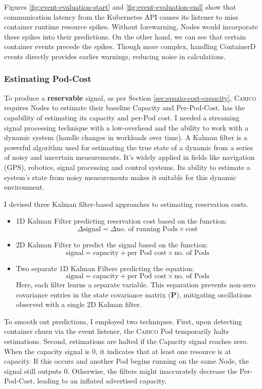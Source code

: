 Figures \ref{fig:event-evaluation-start} and
\ref{fig:event-evaluation-end} show that communication latency from the
Kubernetes API causes its listener to miss container runtime resource spikes.
Without forewarning, Nodes would incorporate these spikes into
their predictions. On the other hand, we can see that certain container
events precede the spikes. Though more complex, handling ContainerD events
directly provides earlier warnings, reducing noise in calculations.

\subsubsection{Estimating Pod-Cost}
\label{sec:estimating-cost}
To produce a \textbf{reservable} signal, as per Section
\ref{sec:spazio-cost-capacity}, \textsc{Carico} requires Nodes to estimate their
baseline Capacity and Per-Pod-Cost. has the capability of estimating its
capacity and per-Pod cost. I needed a streaming signal processing technique with
a low-overhead and the ability to work with a dynamic system (handle changes in
workloads over time). A Kalman filter \cite{} is a powerful algorithm used for
estimating the true state of a dynamic from a series of noisy and uncertain
measurements. It's widely applied in fields like navigation (GPS), robotics,
signal processing and control systems. Its ability to estimate a system's state
from noisy measurements makes it suitable for this dynamic environment.

I devised three Kalman filter-based approaches to estimating reservation costs.
\begin{itemize}
    \item 1D Kalman Filter predicting reservation cost based on the function:
        \[\Delta \text{signal} = \Delta \text{no. of running Pods} \times
        \text{cost}\]
    \item 2D Kalman Filter to predict the signal based on the function:
        \[\text{signal} = \text{capacity} + \text{per Pod cost} \times \text{no.
        of Pods}\]
    \item Two separate 1D Kalman Filters predicting the equation:
        \[\text{signal} = \text{capacity} + \text{per Pod cost} \times \text{no.
        of Pods}\]
        Here, each filter learns a separate variable. This separation prevents
        non-zero covariance entries in the state covariance matrix ($\mathbf{P}$),
        mitigating oscillations observed with a single 2D Kalman filter.
\end{itemize}
To smooth out predictions, I employed two techniques. First, upon detecting
container churn via the event listener, the \textsc{Carico} Pod temporarily
halts estimations. Second, estimations are halted if the Capacity signal reaches
zero. When the capacity signal is 0, it indicates that at least one resource is
at capacity. If this occurs and another Pod begins running on the same Node, the
signal still outputs 0. Otherwise, the filters might inaccurately decrease the
Per-Pod-Cost, leading to an inflated advertised capacity.

